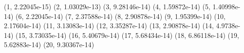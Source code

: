 (1, 2.22045e-15) (2, 1.03029e-13) (3, 9.28146e-14) (4, 1.59872e-14) (5, 1.40998e-14) (6, 2.22045e-14) (7, 2.37588e-14) (8, 2.90878e-14) (9, 1.95399e-14) (10, 2.17604e-14) (11, 3.13083e-14) (12, 3.35287e-14) (13, 2.90878e-14) (14, 4.9738e-14) (15, 3.73035e-14) (16, 5.40679e-14) (17, 5.68434e-14) (18, 6.86118e-14) (19, 5.62883e-14) (20, 9.30367e-14) 